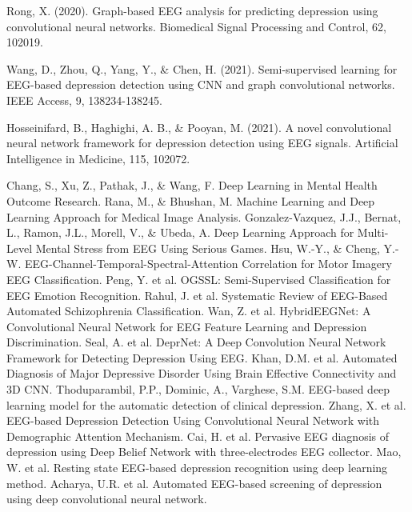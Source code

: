 \documentclass[conference]{IEEEtran}
\begin{document}
\begin{thebibliography}{00}
 Rong, X. (2020). Graph-based EEG analysis for predicting depression using convolutional neural networks. Biomedical Signal Processing and Control, 62, 102019.

 Wang, D., Zhou, Q., Yang, Y., & Chen, H. (2021). Semi-supervised learning for EEG-based depression detection using CNN and graph convolutional networks. IEEE Access, 9, 138234-138245. 

 Hosseinifard, B., Haghighi, A. B., & Pooyan, M. (2021). A novel convolutional neural network framework for depression detection using EEG signals. Artificial Intelligence in Medicine, 115, 102072. 

 Chang, S., Xu, Z., Pathak, J., \& Wang, F. Deep Learning in Mental Health Outcome Research. 
 Rana, M., \& Bhushan, M. Machine Learning and Deep Learning Approach for Medical Image Analysis.
 Gonzalez-Vazquez, J.J., Bernat, L., Ramon, J.L., Morell, V., \& Ubeda, A. Deep Learning Approach for Multi-Level Mental Stress from EEG Using Serious Games.
 Hsu, W.-Y., \& Cheng, Y.-W. EEG-Channel-Temporal-Spectral-Attention Correlation for Motor Imagery EEG Classification.
 Peng, Y. et al. OGSSL: Semi-Supervised Classification for EEG Emotion Recognition.
 Rahul, J. et al. Systematic Review of EEG-Based Automated Schizophrenia Classification.
 Wan, Z. et al. HybridEEGNet: A Convolutional Neural Network for EEG Feature Learning and Depression Discrimination.
 Seal, A. et al. DeprNet: A Deep Convolution Neural Network Framework for Detecting Depression Using EEG.
 Khan, D.M. et al. Automated Diagnosis of Major Depressive Disorder Using Brain Effective Connectivity and 3D CNN.
 Thoduparambil, P.P., Dominic, A., Varghese, S.M. EEG-based deep learning model for the automatic detection of clinical depression.
 Zhang, X. et al. EEG-based Depression Detection Using Convolutional Neural Network with Demographic Attention Mechanism.
 Cai, H. et al. Pervasive EEG diagnosis of depression using Deep Belief Network with three-electrodes EEG collector.
 Mao, W. et al. Resting state EEG-based depression recognition using deep learning method.
 Acharya, U.R. et al. Automated EEG-based screening of depression using deep convolutional neural network.


\end{thebibliography}
\vspace{12pt}
\end{document}
